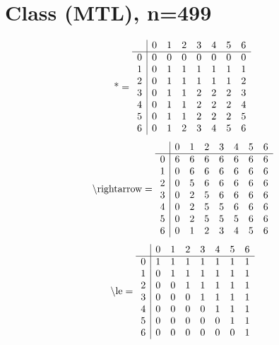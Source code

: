 \documentclass[11pt]{article}
\begin{document}
\section{Class (MTL), n=499}
\[\text{*} = 
\begin{array}{r | r r r r r r r}
 & 0 & 1 & 2 & 3 & 4 & 5 & 6 \\ \hline
0 & 0 & 0 & 0 & 0 & 0 & 0 & 0 \\
1 & 0 & 1 & 1 & 1 & 1 & 1 & 1 \\
2 & 0 & 1 & 1 & 1 & 1 & 1 & 2 \\
3 & 0 & 1 & 1 & 2 & 2 & 2 & 3 \\
4 & 0 & 1 & 1 & 2 & 2 & 2 & 4 \\
5 & 0 & 1 & 1 & 2 & 2 & 2 & 5 \\
6 & 0 & 1 & 2 & 3 & 4 & 5 & 6 \\
\end{array}
\]
\[\text{\textbackslash rightarrow} = 
\begin{array}{r | r r r r r r r}
 & 0 & 1 & 2 & 3 & 4 & 5 & 6 \\ \hline
0 & 6 & 6 & 6 & 6 & 6 & 6 & 6 \\
1 & 0 & 6 & 6 & 6 & 6 & 6 & 6 \\
2 & 0 & 5 & 6 & 6 & 6 & 6 & 6 \\
3 & 0 & 2 & 5 & 6 & 6 & 6 & 6 \\
4 & 0 & 2 & 5 & 5 & 6 & 6 & 6 \\
5 & 0 & 2 & 5 & 5 & 5 & 6 & 6 \\
6 & 0 & 1 & 2 & 3 & 4 & 5 & 6 \\
\end{array}
\]
\[\text{\textbackslash le} = 
\begin{array}{r | r r r r r r r}
 & 0 & 1 & 2 & 3 & 4 & 5 & 6 \\ \hline
0 & 1 & 1 & 1 & 1 & 1 & 1 & 1 \\
1 & 0 & 1 & 1 & 1 & 1 & 1 & 1 \\
2 & 0 & 0 & 1 & 1 & 1 & 1 & 1 \\
3 & 0 & 0 & 0 & 1 & 1 & 1 & 1 \\
4 & 0 & 0 & 0 & 0 & 1 & 1 & 1 \\
5 & 0 & 0 & 0 & 0 & 0 & 1 & 1 \\
6 & 0 & 0 & 0 & 0 & 0 & 0 & 1 \\
\end{array}
\]
\end{document}
